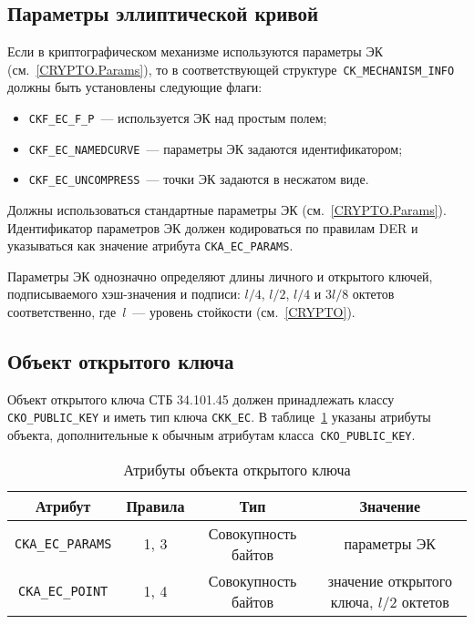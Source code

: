 \subsection{Параметры эллиптической кривой}

Если в криптографическом механизме используются параметры ЭК
(см.~\ref{CRYPTO.Params}), то в соответствующей
структуре~\verb|CK_MECHANISM_INFO| должны быть установлены 
следующие флаги: 
\begin{itemize}
\item
\verb|CKF_EC_F_P|~--- используется ЭК над простым полем;
\item
\verb|CKF_EC_NAMEDCURVE|~--- параметры ЭК задаются идентификатором;
\item
\verb|CKF_EC_UNCOMPRESS|~--- точки ЭК задаются в несжатом виде.
\end{itemize}

Должны использоваться стандартные параметры ЭК
(см.~\ref{CRYPTO.Params}).
Идентификатор параметров ЭК должен кодироваться по правилам
DER и указываться как значение атрибута \verb|CKA_EC_PARAMS|.

Параметры ЭК однозначно определяют длины личного и открытого ключей, 
подписываемого хэш-значения и подписи: $l/4$, $l/2$, $l/4$ и $3l/8$ 
октетов соответственно, где~$l$~--- уровень стойкости (см.~\ref{CRYPTO}). 

\subsection{Объект открытого ключа}


Объект открытого ключа СТБ 34.101.45 должен принадлежать
классу \verb|CKO_PUBLIC_KEY| и иметь тип ключа \verb|CKK_EC|.
%
В таблице~\ref{Table.CRYPTOKI.EcPubkeyAttrs} указаны
атрибуты объекта, дополнительные к обычным атрибутам 
класса~\verb|CKO_PUBLIC_KEY|.

\begin{table}[H]
\caption{Атрибуты объекта открытого ключа}\label{Table.CRYPTOKI.EcPubkeyAttrs}
\begin{tabular}{|c|c|c|c|}
\hline
Атрибут & Правила & Тип & Значение\\
\hline
\hline
\verb|CKA_EC_PARAMS| & 1, 3 & Совокупность байтов &
параметры ЭК\\
\hline
\verb|CKA_EC_POINT| & 1, 4 & Совокупность байтов &
значение открытого ключа, $l/2$ октетов\\
\hline
\end{tabular}
\end{table}

